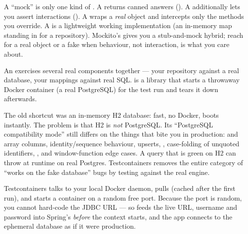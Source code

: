 \begin{behind}
A ``mock'' is only one kind of . A  returns canned answers (). A  additionally lets you assert interactions (). A  wraps a \emph{real} object and intercepts only the methods you override. A  is a lightweight working implementation (an in-memory map standing in for a repository). Mockito's  gives you a stub-and-mock hybrid; reach for a real object or a fake when behaviour, not interaction, is what you care about.
\end{behind}


 An  exercises several real components together --- your repository against a real database, your mappings against real SQL.  is a library that starts a throwaway Docker container (a real PostgreSQL) for the test run and tears it down afterwards.

 The old shortcut was an in-memory H2 database: fast, no Docker, boots instantly. The problem is that H2 is \emph{not} PostgreSQL. Its ``PostgreSQL compatibility mode'' still differs on the things that bite you in production:  and array columns, identity/sequence behaviour,  upserts, , case-folding of unquoted identifiers, , and window-function edge cases. A query that is green on H2 can throw at runtime on real Postgres. Testcontainers removes the entire category of ``works on the fake database'' bugs by testing against the real engine.

 Testcontainers talks to your local Docker daemon, pulls  (cached after the first run), and starts a container on a random free port. Because the port is random, you cannot hard-code the JDBC URL --- so  feeds the live URL, username and password into Spring's  \emph{before} the context starts, and the app connects to the ephemeral database as if it were production.


